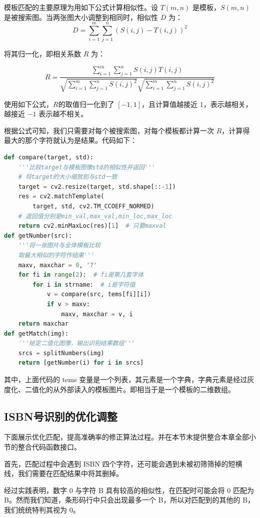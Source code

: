 \documentclass{ctexart}
\begin{document}
模板匹配的主要原理为用如下公式计算相似性。设 $T(m,n)$ 是模板，$S(m,n)$ 是被搜索图。当两张图大小调整到相同时，相似性 $D$ 为：
\[D=\sum_{i=1}^m\sum_{j=1}^n(S(i,j)-T(i,j))^2\]

将其归一化，即相关系数 $R$ 为：

\[
R=\frac
{\sum_{i=1}^m\sum_{j=1}^nS(i,j)T(i,j)}
{\sqrt{\sum_{i=1}^m\sum_{j=1}^nS(i,j)^2}
\sqrt{\sum_{i=1}^m\sum_{j=1}^nS(i,j)^2}}
\]

使用如下公式，$R$的取值归一化到了 $[-1,1]$，且计算值越接近 $1$，表示越相关，越接近 $-1$ 表示越不相关。

根据公式可知，我们只需要对每个被搜索图，对每个模板都计算一次 $R$，计算得最大的那个字符就认为是结果。代码如下：

\begin{lstlisting}[language=python]
def compare(target, std):
    '''比较target与模板图像std的相似性并返回'''
    # 将target的大小缩放到与std一致
    target = cv2.resize(target, std.shape[::-1])
    res = cv2.matchTemplate(
        target, std, cv2.TM_CCOEFF_NORMED)
    # 返回值分别是min_val,max_val,min_loc,max_loc
    return cv2.minMaxLoc(res)[1]  # 只要maxval
def getNumber(src):
    '''将一张图片与全体模板比较
    取最大相似的字符作结果'''
    maxv, maxchar = 0, '?'
    for fi in range(2):  # fi是第几套字体
        for i in strname:  # i是字符值
            v = compare(src, tems[fi][i])
            if v > maxv:
                maxv, maxchar = v, i
    return maxchar
def getMatch(img):
    '''给定二值化图像，输出识别结果数组'''
    srcs = splitNumbers(img)
    return [getNumber(i) for i in srcs]
\end{lstlisting}

其中，上面代码的 tems 变量是一个列表，其元素是一个字典，字典元素是经过灰度化、二值化的从外部读入的模板图片。即相当于是一个模板的二维数组。

\subsection{ISBN号识别的优化调整}

下面展示优化匹配，提高准确率的修正算法过程。并在本节末提供整合本章全部小节的整合代码函数接口。

首先，匹配过程中会遇到 ISBN 四个字符，还可能会遇到未被初筛筛掉的短横线，我们需要在匹配结果中将其删掉。

经过实践表明，数字 0 与字符 B 具有较高的相似性，在匹配时可能会将 0 匹配为 B。然而我们知道，条形码行中只会出现最多一个 B，所以对匹配到的其他的 B，我们统统特判其视为 0。
\end{document}
